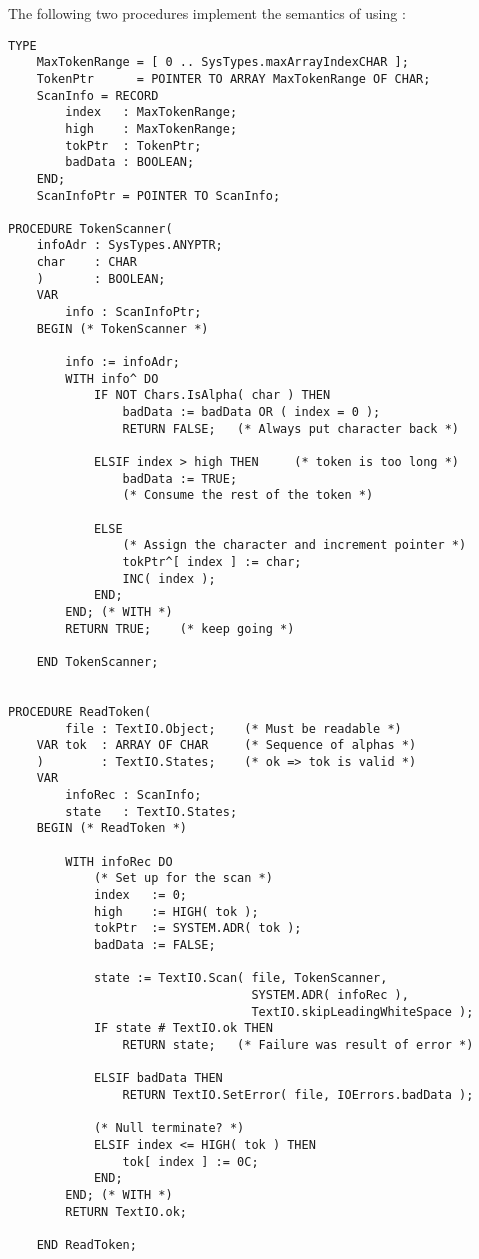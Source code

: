 The following two procedures
implement the semantics of  using :
\begin{verbatim}
TYPE
    MaxTokenRange = [ 0 .. SysTypes.maxArrayIndexCHAR ];
    TokenPtr      = POINTER TO ARRAY MaxTokenRange OF CHAR;
    ScanInfo = RECORD
        index   : MaxTokenRange;
        high    : MaxTokenRange;
        tokPtr  : TokenPtr;
        badData : BOOLEAN;
    END;
    ScanInfoPtr = POINTER TO ScanInfo;

PROCEDURE TokenScanner(
    infoAdr : SysTypes.ANYPTR;
    char    : CHAR
    )       : BOOLEAN;
    VAR
        info : ScanInfoPtr;
    BEGIN (* TokenScanner *)

        info := infoAdr;
        WITH info^ DO
            IF NOT Chars.IsAlpha( char ) THEN
                badData := badData OR ( index = 0 );
                RETURN FALSE;   (* Always put character back *)

            ELSIF index > high THEN     (* token is too long *)
                badData := TRUE;
                (* Consume the rest of the token *)

            ELSE
                (* Assign the character and increment pointer *)
                tokPtr^[ index ] := char;
                INC( index );
            END;
        END; (* WITH *)
        RETURN TRUE;    (* keep going *)
        
    END TokenScanner;

    
PROCEDURE ReadToken(
        file : TextIO.Object;    (* Must be readable *)
    VAR tok  : ARRAY OF CHAR     (* Sequence of alphas *)
    )        : TextIO.States;    (* ok => tok is valid *)
    VAR
        infoRec : ScanInfo;
        state   : TextIO.States;
    BEGIN (* ReadToken *)
    
        WITH infoRec DO
            (* Set up for the scan *)
            index   := 0;
            high    := HIGH( tok );
            tokPtr  := SYSTEM.ADR( tok );
            badData := FALSE;

            state := TextIO.Scan( file, TokenScanner, 
                                  SYSTEM.ADR( infoRec ),
                                  TextIO.skipLeadingWhiteSpace );
            IF state # TextIO.ok THEN
                RETURN state;   (* Failure was result of error *)
                
            ELSIF badData THEN
                RETURN TextIO.SetError( file, IOErrors.badData );
            
            (* Null terminate? *)
            ELSIF index <= HIGH( tok ) THEN
                tok[ index ] := 0C;
            END;
        END; (* WITH *)
        RETURN TextIO.ok;

    END ReadToken;
    
\end{verbatim}

